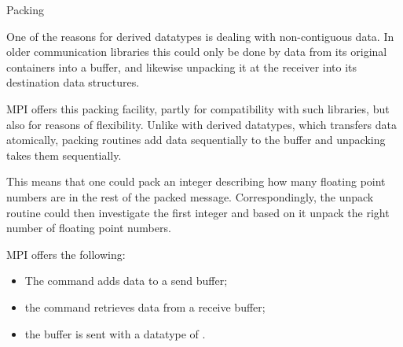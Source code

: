  {Packing}

One of the reasons for derived datatypes is dealing with non-contiguous data.
In older communication libraries this could only be done by  data
from its original containers into a buffer, and likewise unpacking it at the
receiver into its destination data structures.

MPI offers this packing facility, partly for compatibility with such libraries,
but also for reasons of flexibility. Unlike with derived datatypes,
which transfers data atomically, packing routines add data sequentially
to the buffer and unpacking takes them sequentially. 

This means that 
one could pack an integer describing how many floating point numbers
are in the rest of the packed message. 
Correspondingly, the unpack routine could then investigate the first integer
and based on it unpack the right number of floating point numbers.

MPI offers the following:
\begin{itemize}
\item The  command adds data to a send buffer;
\item the  command retrieves data from a receive buffer;
\item the buffer is sent with a datatype of .
\end{itemize}


